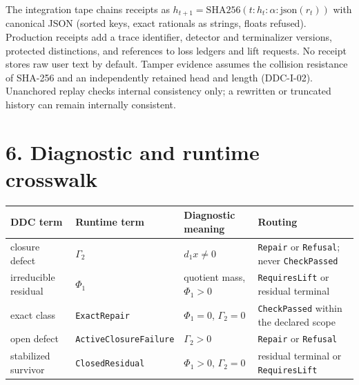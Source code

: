 \documentclass[
  11pt,
]{article}
\renewcommand{\_}{\ddcunderscore\allowbreak}
\begin{document}
The integration tape chains receipts as
\(h_{t+1} = \mathrm{SHA256}(t : h_t : \alpha : \mathrm{json}(r_t))\)
with canonical JSON (sorted keys, exact rationals as strings, floats
refused). Production receipts add a trace identifier, detector and
terminalizer versions, protected distinctions, and references to loss
ledgers and lift requests. No receipt stores raw user text by default.
Tamper evidence assumes the collision resistance of SHA-256 and an
independently retained head and length (DDC-I-02). Unanchored replay
checks internal consistency only; a rewritten or truncated history can
remain internally consistent.

\section{6. Diagnostic and runtime
crosswalk}\label{diagnostic-and-runtime-crosswalk}

\begin{longtable}[]{@{}
  >{\raggedright\arraybackslash}p{}
  >{\raggedright\arraybackslash}p{}
  >{\raggedright\arraybackslash}p{}
  >{\raggedright\arraybackslash}p{}@{}}
\toprule\noalign{}
\begin{minipage}[b]{\linewidth}\raggedright
DDC term
\end{minipage} & \begin{minipage}[b]{\linewidth}\raggedright
Runtime term
\end{minipage} & \begin{minipage}[b]{\linewidth}\raggedright
Diagnostic meaning
\end{minipage} & \begin{minipage}[b]{\linewidth}\raggedright
Routing
\end{minipage} \\
\midrule\noalign{}
\endhead
\bottomrule\noalign{}
\endlastfoot
closure defect & \(\Gamma_2\) & \(d_1 x \neq 0\) & \texttt{Repair} or
\texttt{Refusal}; never \texttt{Check\allowbreak Passed} \\
irreducible residual & \(\Phi_1\) & quotient mass, \(\Phi_1 > 0\) &
\texttt{Requires\allowbreak Lift} or residual terminal \\
exact class & \texttt{Exact\allowbreak Repair} & \(\Phi_1 = 0\), \(\Gamma_2 = 0\) &
\texttt{Check\allowbreak Passed} within the declared scope \\
open defect & \texttt{Active\allowbreak Closure\allowbreak Failure} & \(\Gamma_2 > 0\) &
\texttt{Repair} or \texttt{Refusal} \\
stabilized survivor & \texttt{Closed\allowbreak Residual} & \(\Phi_1 > 0\),
\(\Gamma_2 = 0\) & residual terminal or \texttt{Requires\allowbreak Lift} \\
\end{longtable}
\end{document}
